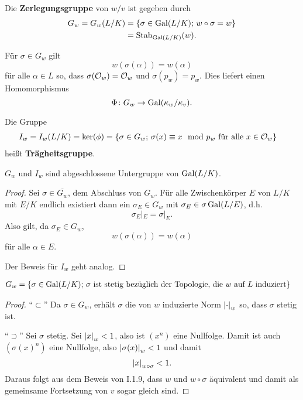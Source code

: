 \begin{defi}
	Die \textbf{Zerlegungsgruppe} von $w/v$ ist gegeben durch
	\begin{align*}
	G_w
	=G_w(L/K)
	&= \left\{ \sigma \in \operatorname{Gal}(L/K); \, w\circ\sigma = w \right\} \\
	&= \operatorname{Stab}_{\operatorname{Gal}(L/K)}(w).
	\end{align*}
\end{defi}

\begin{Bem}
	Für $\sigma \in G_w$ gilt
	\[ w(\sigma(\alpha)) = w(\alpha)
	\]
	für alle $\alpha \in L$ so, dass $\sigma(\mathcal{O}_w) = \mathcal{O}_w$ und $\sigma(p_w) = p_w$.
	Dies liefert einen Homomorphismus
	\[ \Phi \colon G_w \to \operatorname{Gal}(\kappa_w/\kappa_v).
	\]
\end{Bem}

\begin{defi} Die Gruppe
	\begin{align*}
	I_w 
	=I_w(L/K)
	&= \ker(\phi)= \left\{
	\sigma \in G_w; \, \sigma(x) \equiv x \mod p_w \text{ für alle } x \in \mathcal{O}_w
	\right\}
	\end{align*}
	heißt \textbf{Trägheitsgruppe}.
\end{defi}


\begin{Prop}
	$G_w$ und $I_w$ sind abgeschlossene Untergruppe von $\operatorname{Gal}(L/K)$.
\end{Prop}


\begin{proof}
	Sei $\sigma \in \overline{G_w}$, dem Abschluss von $G_w$. Für alle Zwischenkörper $E$ von $L/K$ mit $E/K$ endlich existiert dann ein $\sigma_E \in G_w$ mit
	$\sigma_E \in \sigma \operatorname{Gal}(L/E)$, d.h.
	\[ \sigma_E|_E = \sigma|_E.
	\]
	Also gilt, da $\sigma_E \in G_w$,
	\[ w(\sigma(\alpha)) = w(\alpha)
	\]
	für alle $\alpha \in E$.
	
	\bigskip
	Der Beweis für $I_w$ geht analog.
\end{proof}

\begin{Prop}
	\begin{align*}
	G_w
	&=
	\left\{ 
	\sigma \in \operatorname{Gal}(L/K); \,\text{$\sigma$ ist stetig bezüglich der Topologie, die $w$ auf $L$ induziert}
	\right\}
	\end{align*}
\end{Prop}

\begin{proof}
	\enquote{$\subset$} Da $\sigma \in G_w$, erhält $\sigma$ die von $w$ induzierte Norm $\left|{\cdot}\right|_w$ so, dass $\sigma$ stetig ist.
	
	\bigskip \enquote{$\supset$} Sei $\sigma$ stetig. Sei $\left|{x}\right|_w < 1$, also ist $(x^n)$ eine Nullfolge. Damit ist auch $(\sigma(x)^n)$ eine Nullfolge, also
	$\left|{\sigma(x)}\right|_w <1$ und damit
	\[ \left|{x}\right|_{w\circ \sigma} < 1.
	\]
	Daraus folgt aus dem Beweis von I.1.9, dass $w$ und $w\circ\sigma$ äquivalent und damit als gemeinsame Fortsetzung von $v$ sogar gleich sind.
\end{proof}


